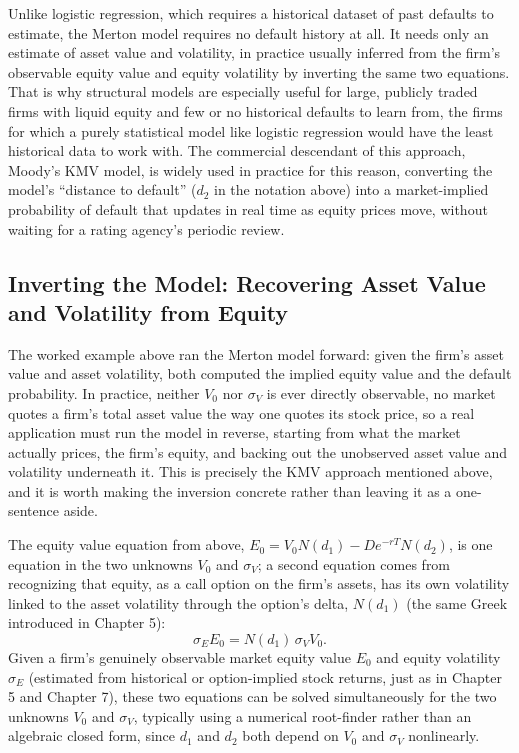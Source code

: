 \documentclass[../ai_in_finance]{subfiles}
\begin{document}
Unlike logistic regression, which requires a historical dataset of past defaults to estimate, the Merton model requires no default history at all. It needs only an estimate of asset value and volatility, in practice usually inferred from the firm's observable equity value and equity volatility by inverting the same two equations. That is why structural models are especially useful for large, publicly traded firms with liquid equity and few or no historical defaults to learn from, the firms for which a purely statistical model like logistic regression would have the least historical data to work with.
The commercial descendant of this approach, Moody's KMV model, is widely used in practice for this reason, converting the model's ``distance to default'' ($d_2$ in the notation above) into a market-implied probability of default that updates in real time as equity prices move, without waiting for a rating agency's periodic review.

\subsection{Inverting the Model: Recovering Asset Value and Volatility from Equity}

The worked example above ran the Merton model forward: given the firm's asset value and asset volatility, both computed the implied equity value and the default probability. In practice, neither $V_0$ nor $\sigma_V$ is ever directly observable, no market quotes a firm's total asset value the way one quotes its stock price, so a real application must run the model in reverse, starting from what the market actually prices, the firm's equity, and backing out the unobserved asset value and volatility underneath it. This is precisely the KMV approach mentioned above, and it is worth making the inversion concrete rather than leaving it as a one-sentence aside.

The equity value equation from above, $E_0 = V_0 N(d_1) - De^{-rT}N(d_2)$, is one equation in the two unknowns $V_0$ and $\sigma_V$; a second equation comes from recognizing that equity, as a call option on the firm's assets, has its own volatility linked to the asset volatility through the option's delta, $N(d_1)$ (the same Greek introduced in Chapter 5):
\begin{equation*}
\sigma_E E_0 = N(d_1)\,\sigma_V V_0.
\end{equation*}
Given a firm's genuinely observable market equity value $E_0$ and equity volatility $\sigma_E$ (estimated from historical or option-implied stock returns, just as in Chapter 5 and Chapter 7), these two equations can be solved simultaneously for the two unknowns $V_0$ and $\sigma_V$, typically using a numerical root-finder rather than an algebraic closed form, since $d_1$ and $d_2$ both depend on $V_0$ and $\sigma_V$ nonlinearly.
\end{document}
